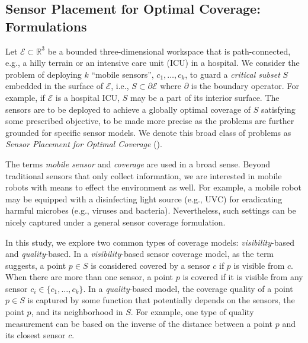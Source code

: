 \subsection{Sensor Placement for Optimal Coverage: Formulations}
Let $\mathcal E \subset \mathbb R^3$ be a bounded three-dimensional workspace that is path-connected, e.g., a hilly terrain or an intensive care unit (ICU) in a hospital. We consider the problem of deploying $k$ ``mobile sensors'', $c_1, \ldots, c_k$, to guard a \emph{critical subset} $S$ embedded in the surface of $\mathcal E$, i.e., $S \subset \partial \mathcal E$ where $\partial$ is the boundary operator. For example, if $\mathcal E$ is a hospital ICU, $S$ may be a part of its interior surface. The sensors are to be deployed to achieve a globally optimal coverage of $S$ satisfying some prescribed objective, to be made more precise as the problems are further grounded for specific sensor models. We denote this broad class of problems as \emph{Sensor Placement for Optimal Coverage} (\spoc). 
%

The terms \emph{mobile sensor} and \emph{coverage} are used in a broad sense. Beyond traditional sensors that only collect information, we are interested in mobile robots with means to effect the environment as well. For example, a mobile robot may be equipped with a disinfecting light source (e.g., UVC) for eradicating harmful microbes (e.g., viruses and bacteria). Nevertheless, such settings can be nicely captured under a general sensor coverage formulation. 

In this study, we explore two common types of coverage models: \emph{visibility}-based and \emph{quality}-based. 
%
In a \emph{visibility}-based sensor coverage model, as the term suggests, a point $p \in S$ is considered covered by a sensor $c$ if $p$ is visible from $c$.
When there are more than one sensor, a point $p$ is covered if it is visible from any sensor $c_i \in \{c_1, \ldots, c_k\}$. 
%
In a \emph{quality}-based model, the coverage quality of a point $p \in S$ is captured by some function that potentially depends on the sensors, the point $p$, and its neighborhood in $S$. For example, one type of quality measurement can be based on the inverse of the distance between a point $p$ and its closest sensor $c$. 

